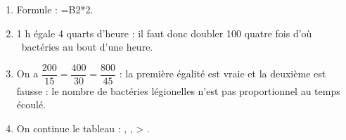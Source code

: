 \begin{enumerate}
%
	\begin{enumerate}
		\item %
		Formule : =B2*2.
		\item %
1 h égale 4 quarts d'heure : il faut donc doubler 100 quatre fois d'où  ~bactéries au bout d'une heure.
		\item %
On a $\dfrac{200}{15} = \dfrac{400}{30} = \dfrac{800}{45}$ : la première égalité est vraie et la deuxième est fausse : le nombre de bactéries légionelles n'est pas proportionnel au temps écoulé.
		\item %
On continue le tableau : , ,  > .


\end{enumerate}
\end{enumerate}
